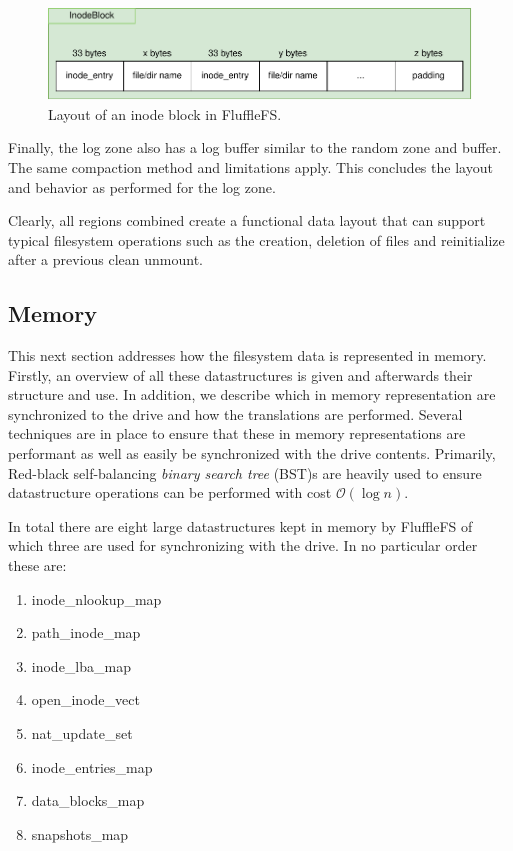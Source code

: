 \begin{figure}[h!]
    \centering
	\includegraphics[width=1\textwidth]{resources/images/fluffle-inodeblock.pdf}
	\caption{Layout of an inode block in FluffleFS.}
    \label{figure:fluffleinodeblock}
\end{figure}

Finally, the log zone also has a log buffer similar to the random zone and
buffer. The same compaction method and limitations apply. This concludes the
layout and behavior as performed for the log zone.

Clearly, all regions combined create a functional data layout that can support
typical filesystem operations such as the creation, deletion of files and
reinitialize after a previous clean unmount.

\subsection{Memory}

This next section addresses how the filesystem data is represented in memory.
Firstly, an overview of all these datastructures is given and afterwards their
structure and use. In addition, we describe which in memory representation are
synchronized to the drive and how the translations are performed. Several
techniques are in place to ensure that these in memory representations are
performant as well as easily be synchronized with the drive contents. Primarily,
Red-black self-balancing \textit{binary search tree} (BST)s
\cite{Bayer2004SymmetricBB} are heavily used to ensure datastructure operations
can be performed with cost $\mathcal{O}(\log n)$.

In total there are eight large datastructures kept in memory by FluffleFS of
which three are used for synchronizing with the drive. In no particular order
these are:

\begin{enumerate}
    \item inode\_nlookup\_map
    \item path\_inode\_map
    \item inode\_lba\_map
    \item open\_inode\_vect
    \item nat\_update\_set
    \item inode\_entries\_map
    \item data\_blocks\_map
    \item snapshots\_map
\end{enumerate}

